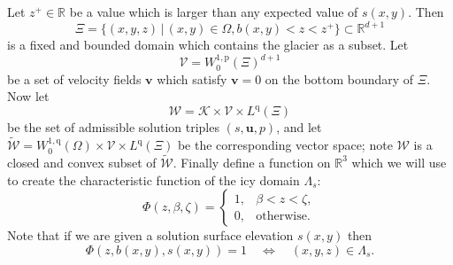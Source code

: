 \documentclass[letterpaper,final,12pt,reqno]{amsart}
\theoremstyle{claim}
\newcommand{\RR}{\mathbb{R}}
\newcommand{\bu}{\mathbf{u}}
\newcommand{\bv}{\mathbf{v}}
\newcommand{\pp}{{\text{p}}}
\newcommand{\qq}{{\text{q}}}
\numberwithin{equation}{section}
\numberwithin{figure}{section}
\numberwithin{table}{section}
\numberwithin{theorem}{section}
\begin{document}
Let $z^+ \in \RR$ be a value which is larger than any expected value of $s(x,y)$.  Then
\begin{equation}
\Xi = \{(x,y,z)\,|\, (x,y) \in \Omega, b(x,y) < z < z^+\} \subset \RR^{d+1}  \label{eq:Xi}
\end{equation}
is a fixed and bounded domain which contains the glacier as a subset.  Let
\begin{equation}
\mathcal{V} = W_0^{1,\pp}(\Xi)^{d+1}
\end{equation}
be a set of velocity fields $\bv$ which satisfy $\bv=0$ on the bottom boundary of $\Xi$.  Now let
\begin{equation}
\mathcal{W} = \mathcal{K} \times \mathcal{V} \times L^\qq(\Xi)  \label{eq:Wset}
\end{equation}
be the set of admissible solution triples $(s,\bu,p)$, and let $\tilde{\mathcal{W}} = W_0^{1,\qq}(\Omega) \times \mathcal{V} \times L^\qq(\Xi)$ be the corresponding vector space; note $\mathcal{W}$ is a closed and convex subset of $\tilde{\mathcal{W}}$.  Finally define a function on $\RR^3$ which we will use to create the characteristic function of the icy domain $\Lambda_s$:
\begin{equation}
\Phi(z,\beta,\zeta) = \begin{cases} 1, & \beta < z < \zeta, \\ 0, & \text{otherwise}.  \end{cases}
\end{equation}
Note that if we are given a solution surface elevation $s(x,y)$ then
    $$\Phi(z,b(x,y),s(x,y)) = 1 \quad \iff \quad (x,y,z) \in \Lambda_s.$$
\end{document}
